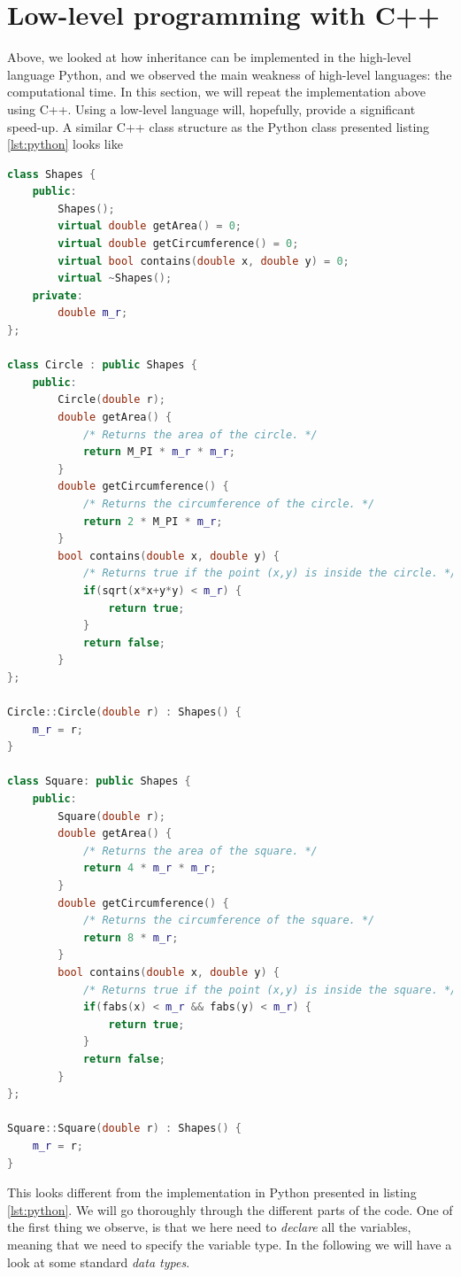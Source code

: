 \section{Low-level programming with C++}
Above, we looked at how inheritance can be implemented in the high-level language Python, and we observed the main weakness of high-level languages: the computational time. In this section, we will repeat the implementation above using C++. Using a low-level language will, hopefully, provide a significant speed-up. A similar C++ class structure as the Python class presented listing \ref{lst:python} looks like
\lstset{basicstyle=\scriptsize}
\begin{lstlisting}[language=c++, caption={Geometric shapes implemented in object-oriented C++.}, label={lst:cpp}]
class Shapes {
	public:
		Shapes();
		virtual double getArea() = 0;
		virtual double getCircumference() = 0;
		virtual bool contains(double x, double y) = 0;
		virtual ~Shapes();
	private:
		double m_r;
};

class Circle : public Shapes {
	public:
		Circle(double r);
		double getArea() {
			/* Returns the area of the circle. */
			return M_PI * m_r * m_r;
		}
		double getCircumference() {
			/* Returns the circumference of the circle. */
			return 2 * M_PI * m_r;
		}
		bool contains(double x, double y) {
			/* Returns true if the point (x,y) is inside the circle. */
			if(sqrt(x*x+y*y) < m_r) {
				return true;
			}
			return false;
		}
};

Circle::Circle(double r) : Shapes() {
	m_r = r;
}

class Square: public Shapes {
	public:
		Square(double r);
		double getArea() {
			/* Returns the area of the square. */
			return 4 * m_r * m_r;
		}
		double getCircumference() {
			/* Returns the circumference of the square. */
			return 8 * m_r;
		}
		bool contains(double x, double y) {
			/* Returns true if the point (x,y) is inside the square. */
			if(fabs(x) < m_r && fabs(y) < m_r) {
				return true;
			}
			return false;
		}
};

Square::Square(double r) : Shapes() {
	m_r = r;
}
\end{lstlisting}
This looks different from the implementation in Python presented in listing \eqref{lst:python}. We will go thoroughly through the different parts of the code. One of the first thing we observe, is that we here need to \textit{declare} all the variables, meaning that we need to specify the variable type. In the following we will have a look at some standard \textit{data types}.

